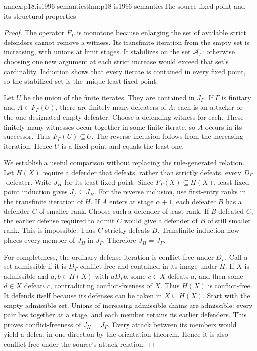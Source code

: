 \begin{annexitem}{annex:p18.is1996-semantics}{thm:p18-is1996-semantics}{The source fixed point and its structural properties}
\begin{proof}
The operator \(F_\Gamma\) is monotone because enlarging the
set of available strict defenders cannot remove a witness.
Its transfinite iteration from the empty set is increasing,
with unions at limit stages. It stabilizes on the set
\(\mathcal A_\Gamma\): otherwise choosing one new argument at
each strict increase would exceed that set's cardinality.
Induction shows that every iterate is contained in every fixed
point, so the stabilized set is the unique least fixed point.

Let \(U\) be the union of the finite iterates.
They are contained in \(J_\Gamma\).
If \(\Gamma\) is finitary and \(A\in F_\Gamma(U)\), there
are finitely many defeaters of \(A\): each is an attacker or
the one designated empty defeater. Choose a defending witness
for each. These finitely many witnesses occur together in
some finite iterate, so \(A\) occurs in its successor.
Thus \(F_\Gamma(U)\subseteq U\).
The reverse inclusion follows from the increasing iteration.
Hence \(U\) is a fixed point and equals the least one.

We establish a useful comparison without replacing the rule-generated
relation. Let \(H(X)\) require a defender that defeats, rather
than strictly defeats, every \(D_\Gamma\)-defeater.
Write \(J_H\) for its least fixed point.
Since \(F_\Gamma(X)\subseteq H(X)\), least-fixed-point
induction gives \(J_\Gamma\subseteq J_H\).
For the reverse inclusion, use first-entry ranks in the
transfinite iteration of \(H\).
If \(A\) enters at stage \(\alpha+1\), each defeater \(B\)
has a defender \(C\) of smaller rank.
Choose such a defender of least rank.
If \(B\) defeated \(C\), the earlier defense required to
admit \(C\) would give a defender of \(B\) of still smaller
rank. This is impossible. Thus \(C\) strictly defeats \(B\).
Transfinite induction now places every member of \(J_H\)
in \(J_\Gamma\). Therefore \(J_H=J_\Gamma\).

For completeness, the ordinary-defense iteration is conflict-free
under \(D_\Gamma\).
Call a set admissible if it is \(D_\Gamma\)-conflict-free
and contained in its image under \(H\).
If \(X\) is admissible and \(a,b\in H(X)\) with \(aD_\Gamma b\),
some \(c\in X\) defeats \(a\), and then some \(d\in X\)
defeats \(c\), contradicting conflict-freeness of \(X\).
Thus \(H(X)\) is conflict-free.
It defends itself because its defenses can be taken in
\(X\subseteq H(X)\).
Start with the empty admissible set. Unions of increasing
admissible chains are admissible: every pair lies together
at a stage, and each member retains its earlier defenders.
This proves conflict-freeness of \(J_H=J_\Gamma\).
Every attack between its members would yield a defeat in
one direction by the orientation theorem. Hence it is also
conflict-free under the source's attack relation.


\end{proof}
\end{annexitem}
